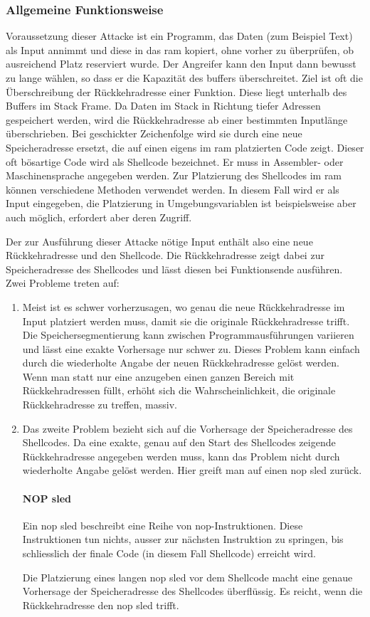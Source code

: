 \documentclass[11pt, a4paper]{article}
\begin{document}
\subsubsection{Allgemeine Funktionsweise}
Voraussetzung dieser Attacke ist ein Programm, das Daten (zum Beispiel Text) als Input annimmt und diese in das \gls{ram} kopiert, ohne vorher zu überprüfen, ob ausreichend Platz reserviert wurde. Der Angreifer kann den Input dann bewusst zu lange wählen, so dass er die Kapazität des buffers überschreitet. Ziel ist oft die Überschreibung der Rückkehradresse einer Funktion. Diese liegt unterhalb des Buffers im Stack Frame. Da Daten im Stack in Richtung tiefer Adressen gespeichert werden, wird die Rückkehradresse ab einer bestimmten Inputlänge überschrieben. Bei geschickter Zeichenfolge wird sie durch eine neue Speicheradresse ersetzt, die auf einen eigens im \gls{ram} platzierten Code zeigt. Dieser oft bösartige Code wird als Shellcode bezeichnet. Er muss in Assembler- oder Maschinensprache angegeben werden. Zur Platzierung des Shellcodes im \gls{ram} können verschiedene Methoden verwendet werden. In diesem Fall wird er als Input eingegeben, die Platzierung in Umgebungsvariablen ist beispielsweise aber auch möglich, erfordert aber deren Zugriff.

Der zur Ausführung dieser Attacke nötige Input enthält also eine neue Rückkehradresse und den Shellcode. Die Rückkehradresse zeigt dabei zur Speicheradresse des Shellcodes und lässt diesen bei Funktionsende ausführen. Zwei Probleme treten auf:
\begin{enumerate}
	\item Meist ist es schwer vorherzusagen, wo genau die neue Rückkehradresse im Input platziert werden muss, damit sie die originale Rückkehradresse trifft. Die Speichersegmentierung kann zwischen Programmausführungen variieren und lässt eine exakte Vorhersage nur schwer zu. Dieses Problem kann einfach durch die wiederholte Angabe der neuen Rückkehradresse gelöst werden. Wenn man statt nur eine anzugeben einen ganzen Bereich mit Rückkehradressen füllt, erhöht sich die Wahrscheinlichkeit, die originale Rückkehradresse zu treffen, massiv.
	\item Das zweite Problem bezieht sich auf die Vorhersage der Speicheradresse des Shellcodes. Da eine exakte, genau auf den Start des Shellcodes zeigende Rückkehradresse angegeben werden muss, kann das Problem nicht durch wiederholte Angabe gelöst werden. Hier greift man auf einen \gls{nop} sled zurück.
	\paragraph{NOP sled}
	Ein \gls{nop} sled beschreibt eine Reihe von \gls{nop}-Instruktionen. Diese Instruktionen tun nichts, ausser zur nächsten Instruktion zu springen, bis schliesslich der finale Code (in diesem Fall Shellcode) erreicht wird.
	
	Die Platzierung eines langen \gls{nop} sled vor dem Shellcode macht eine genaue Vorhersage der Speicheradresse des Shellcodes überflüssig. Es reicht, wenn die Rückkehradresse den \gls{nop} sled trifft.
\end{enumerate}
\end{document}
